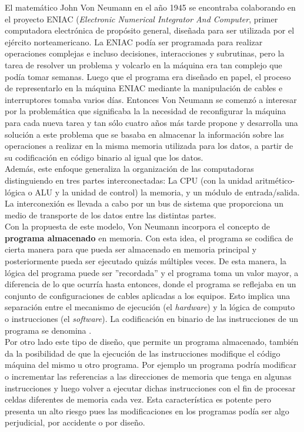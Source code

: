 El matemático John Von Neumann en el año 1945 se encontraba colaborando en el proyecto ENIAC (\textit{Electronic Numerical Integrator And Computer}, primer computadora electrónica de propósito general, diseñada para ser utilizada por el ejército norteamericano. La ENIAC podía ser programada para realizar operaciones complejas e incluso decisiones, interacciones y subrutinas, pero la tarea de resolver un problema y volcarlo en la máquina era tan complejo que podía tomar semanas. Luego que el programa era diseñado en papel, el proceso de representarlo en la máquina ENIAC mediante la manipulación de cables e interruptores tomaba varios días. Entonces Von Neumann se comenzó a interesar por la problemática que significaba la la necesidad de reconfigurar la máquina para cada nueva tarea y tan sólo cuatro años más tarde propone y desarrolla una solución a este problema que se basaba en almacenar la información sobre las operaciones a realizar en la misma memoria utilizada para los datos, a partir de su codificación en código binario al igual que los datos.\\

Además, este enfoque generaliza la organización de las computadoras distinguiendo en tres partes interconectadas: La CPU (con la unidad aritmético-lógica o ALU y la unidad de control) la memoria, y un módulo de entrada/salida. La interconexión es llevada a cabo por un bus de sistema que proporciona un medio de transporte de los datos entre las distintas partes. \\

Con la propuesta de este modelo, Von Neumann incorpora el concepto de \textbf{programa almacenado} en memoria. Con esta idea, el programa se codifica de cierta manera para que pueda ser almacenado en memoria principal y posteriormente pueda ser ejecutado quizás múltiples veces. De esta manera, la lógica del programa puede ser ''recordada'' y el programa toma un valor mayor, a diferencia de lo que ocurría hasta entonces, donde el programa se reflejaba en un conjunto de configuraciones de cables aplicadas a los equipos. Esto implica una separación entre el mecanismo de ejecución (el \textit{hardware}) y la lógica de computo o instrucciones (el \textit{software}). La codificación en binario de las instrucciones de un programa se denomina \textbf{\codmaq}.\\

Por otro lado este tipo de diseño, que permite un programa almacenado, también da la posibilidad de que la ejecución de las instrucciones modifique el código máquina del mismo u otro programa. Por ejemplo un programa podría modificar o incrementar las referencias a las direcciones de memoria que tenga en algunas instrucciones y luego volver a ejecutar dichas instrucciones con el fin de procesar celdas diferentes de memoria cada vez. Esta característica es potente pero presenta un alto riesgo pues las modificaciones en los programas podía ser algo perjudicial, por accidente o por diseño.

